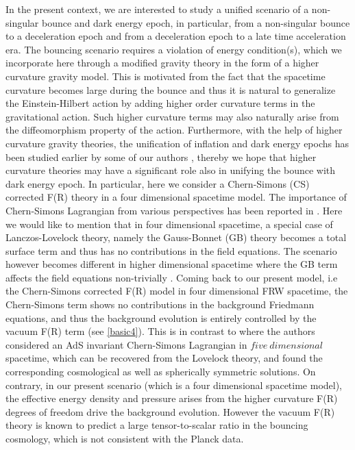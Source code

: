\documentclass{article}
\begin{document}
In the present context, we are interested to study a unified scenario of a non-singular bounce and dark energy epoch, 
in particular, from a non-singular bounce to a deceleration epoch and from
a deceleration epoch to a late time acceleration era. The bouncing scenario 
requires a violation of energy condition(s), which we incorporate here through a  modified gravity theory in the form of a higher curvature 
gravity model. This is motivated from the fact that the spacetime curvature becomes large during the bounce and thus it is natural 
to generalize the Einstein-Hilbert action by adding higher order curvature terms in the gravitational action. Such higher curvature terms 
may also naturally arise from the diffeomorphism property of the action. Furthermore, with the help of higher curvature 
gravity theories, the unification of inflation and dark energy epochs has been studied earlier by some of our authors \cite{Nojiri:2019fft,
Nojiri:2020wmh}, thereby we hope that higher curvature theories may have a significant role also in unifying the bounce with dark energy epoch. 
In particular, here we consider a Chern-Simons (CS) corrected 
F(R) theory in a four dimensional spacetime model. The importance of Chern-Simons Lagrangian from various perspectives 
has been reported in \cite{Bajardi:2021hya}. Here we would like to mention that in four dimensional spacetime, a special case of
Lanczos-Lovelock theory, namely the Gauss-Bonnet (GB) theory becomes a total surface term and thus has no contributions in the field equations. 
The scenario however becomes different in higher dimensional spacetime 
where the GB term affects the field equations non-trivially \cite{Bajardi:2021hya}. Coming back to our present model, i.e the 
Chern-Simons corrected F(R) model in four dimensional FRW spacetime, the Chern-Simons term shows no contributions in the background Friedmann equations, 
and thus the background evolution is entirely controlled by the vacuum F(R) term (see \ref{basic4}). This is in contrast to 
\cite{Bajardi:2021hya} where the authors considered an AdS invariant Chern-Simons Lagrangian in $five~dimensional$ spacetime, which can be 
recovered from the Lovelock theory, and found the corresponding cosmological as well as spherically symmetric solutions. 
On contrary, in our present scenario (which is a four dimensional spacetime model), the 
effective energy density and pressure arises from the higher curvature F(R) degrees of freedom drive the background evolution. However the  
vacuum F(R) theory is known to predict a large tensor-to-scalar ratio in the bouncing cosmology, which is not consistent with the Planck data. 
\end{document}
